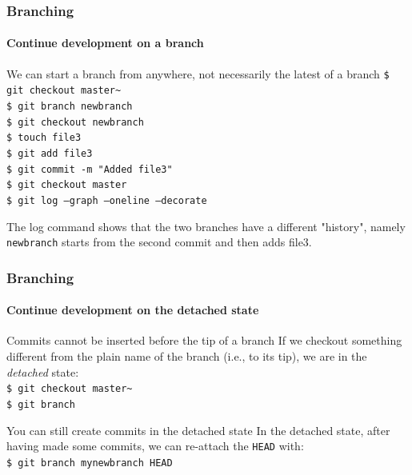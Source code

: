 \begin{frame}
\frametitle{Branching}
\framesubtitle{Continue development on a branch}

\begin{block}{We can start a branch from anywhere, not necessarily the latest of a branch}
\texttt{\$ git checkout master\textasciitilde{}} \\
\texttt{\$ git branch newbranch} \\
\texttt{\$ git checkout newbranch} \\
\texttt{\$ touch file3} \\
\texttt{\$ git add file3} \\
\texttt{\$ git commit -m "Added file3"} \\
\texttt{\$ git checkout master} \\
\texttt{\$ git log ---graph ---oneline ---decorate}
\medskip

The log command shows that the two branches have a different "history", namely \texttt{newbranch} starts from the second commit and then adds file3.
\end{block}
\end{frame}

\begin{frame}
\frametitle{Branching}
\framesubtitle{Continue development on the detached state}

\begin{block}{Commits cannot be inserted before the tip of a branch}
If we checkout something different from the plain name of the branch (i.e., to its tip), we are in the {\em detached} state: \\
\texttt{\$ git checkout master\textasciitilde{}} \\
\texttt{\$ git branch}
\end{block}
\pause
\begin{block}{You can still create commits in the detached state}
In the detached state, after having made some commits, we can re-attach the \texttt{HEAD} with: \\
\texttt{\$ git branch mynewbranch HEAD}
\end{block}

\end{frame}

